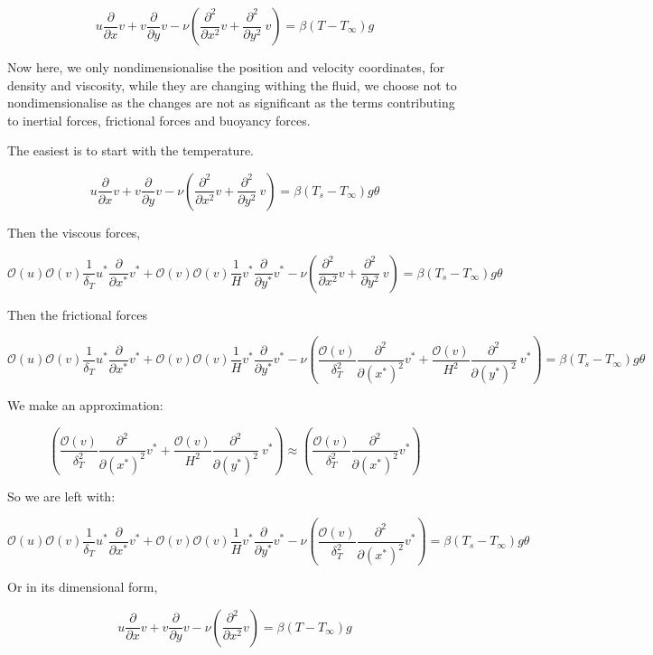 \documentclass[11pt]{article}
\begin{document}
$$ u \frac{\partial}{\partial x} v +  v \frac{\partial}{\partial y} v  - \nu ( \frac{\partial^2}{\partial x^2} v + \frac{\partial^2}{\partial y^2} \ v ) = \beta(T-T_\infty)  g$$



Now here, we only nondimensionalise the position and velocity coordinates, for density and viscosity, while they are changing withing the fluid, we choose not to nondimensionalise as the changes are not as significant as the terms contributing to inertial forces, frictional forces and buoyancy forces.

The easiest is to start with the temperature.

$$ u \frac{\partial}{\partial x} v +  v \frac{\partial}{\partial y} v  -\nu ( \frac{\partial^2}{\partial x^2} v + \frac{\partial^2}{\partial y^2} \ v ) = \beta(T_s-T_\infty) g \theta $$

Then the viscous forces,

$$ \mathcal{O}(u) \mathcal{O}(v) \frac{1}{\delta_T} u^* \frac{\partial}{\partial x^*} v^* +  \mathcal{O}(v) \mathcal{O}(v) \frac{1}{H} v^* \frac{\partial}{\partial y^*} v^*  -\nu ( \frac{\partial^2}{\partial x^2} v + \frac{\partial^2}{\partial y^2} \ v ) = \beta(T_s-T_\infty) g \theta $$

Then the frictional forces

$$  \mathcal{O}(u) \mathcal{O}(v) \frac{1}{\delta_T} u^* \frac{\partial}{\partial x^*} v^* +  \mathcal{O}(v) \mathcal{O}(v) \frac{1}{H} v^* \frac{\partial}{\partial y^*} v^*  -\nu ( \frac{\mathcal{O}(v)}{\delta_T^2} \frac{\partial^2}{\partial (x^*)^2} v^* + \frac{\mathcal{O}(v)}{H^2} \frac{\partial^2}{\partial (y^*)^2} \ v^* ) = \beta(T_s-T_\infty) g \theta $$

We make an approximation:

$$( \frac{\mathcal{O}(v)}{\delta_T^2} \frac{\partial^2}{\partial (x^*)^2} v^* + \frac{\mathcal{O}(v)}{H^2} \frac{\partial^2}{\partial (y^*)^2} \ v^* ) \approx ( \frac{\mathcal{O}(v)}{\delta_T^2} \frac{\partial^2}{\partial (x^*)^2} v^* )$$

So we are left with:

$$  \mathcal{O}(u) \mathcal{O}(v) \frac{1}{\delta_T} u^* \frac{\partial}{\partial x^*} v^* + \mathcal{O}(v) \mathcal{O}(v) \frac{1}{H} v^* \frac{\partial}{\partial y^*} v^*  -\nu ( \frac{\mathcal{O}(v)}{\delta_T^2} \frac{\partial^2}{\partial (x^*)^2} v^* ) = \beta(T_s-T_\infty) g \theta $$

Or in its dimensional form,

$$ u \frac{\partial}{\partial x} v +  v \frac{\partial}{\partial y} v  - \nu ( \frac{\partial^2}{\partial x^2} v) = \beta(T-T_\infty)  g$$
\end{document}
